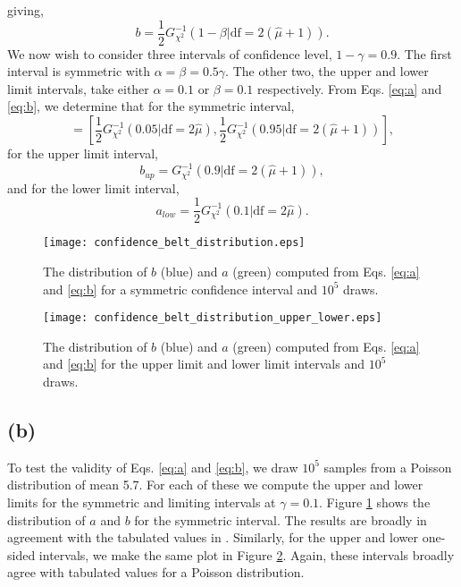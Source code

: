 \documentclass[12pt]{article}
\begin{document}
giving,
\begin{equation} \label{eq:b}
b = \frac{1}{2} G^{-1}_{\chi^2} (1 - \beta \vert \text{df}=2(\hat{\mu} + 1)).
\end{equation}
We now wish to consider three intervals of confidence level, $1 - \gamma = 0.9$. The first interval is symmetric with $\alpha = \beta = 0.5 \gamma$.  The other two, the upper and lower limit intervals, take either $\alpha = 0.1$ or $\beta = 0.1$ respectively.  From Eqs. \eqref{eq:a} and \eqref{eq:b}, we determine that for the symmetric interval, 
\begin{equation}
[a_{sym},b_{sym}] = \left[\frac{1}{2} G^{-1}_{\chi^2} (0.05 \vert \text{df}=2\hat{\mu}), \frac{1}{2} G^{-1}_{\chi^2} (0.95 \vert \text{df}=2(\hat{\mu} + 1))\right],
\end{equation}
for the upper limit interval,
\begin{equation}
b_{up} =  G^{-1}_{\chi^2} (0.9 \vert \text{df}=2(\hat{\mu} + 1)),
\end{equation}
and for the lower limit interval, 
\begin{equation}
a_{low} = \frac{1}{2} G^{-1}_{\chi^2} (0.1 \vert \text{df}=2\hat{\mu}).
\end{equation}

\begin{figure}
\texttt{[image: confidence\_belt\_distribution.eps]}
\caption{The distribution of $b$ (blue) and $a$ (green) computed from Eqs. \eqref{eq:a} and \eqref{eq:b} for a symmetric confidence interval and $10^5$ draws.  } \label{fig:symmetric}
\end{figure}

\begin{figure}
\texttt{[image: confidence\_belt\_distribution\_upper\_lower.eps]}
\caption{The distribution of $b$ (blue) and $a$ (green) computed from Eqs. \eqref{eq:a} and \eqref{eq:b} for the upper limit and lower limit intervals and $10^5$ draws.  } \label{fig:one_sided} 
\end{figure}

\subsection*{(b)}
To test the validity of Eqs. \eqref{eq:a} and \eqref{eq:b}, we draw $10^5$ samples from a Poisson distribution of mean 5.7.  For each of these we compute the upper and lower limits for the symmetric and limiting intervals at $\gamma = 0.1$.  Figure \ref{fig:symmetric} shows the distribution of $a$ and $b$ for the symmetric interval.  The results are broadly in agreement with the tabulated values in \citet{cowan1998statistical}.  Similarly, for the upper and lower one-sided intervals, we make the same plot in Figure \ref{fig:one_sided}.  Again, these intervals broadly agree with tabulated values for a Poisson distribution. 
\end{document}
